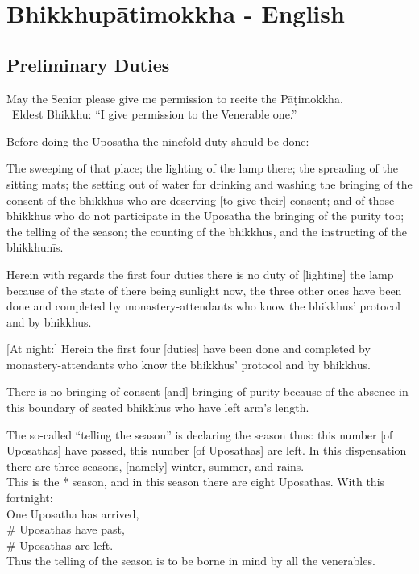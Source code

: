 


\chapter{Bhikkhupātimokkha - English}

\clearpage



\section{Preliminary Duties}
\label{preliminary-duties}

\begin{intro}
	May the Senior please give me permission to recite the Pāṭimokkha.\\
	\anglebracketleft\ \hspace{-0.5mm}Eldest Bhikkhu: ``I give permission to the Venerable one.'' \hspace{-0.5mm}\anglebracketright\
\end{intro}

Before doing the Uposatha the ninefold duty should be done:

The sweeping of that place; the lighting of the lamp there; the spreading of the sitting mats; the setting out of water for drinking and washing the bringing of the consent of the bhikkhus who are deserving [to give their] consent; and of those bhikkhus who do not participate in the Uposatha the bringing of the purity too; the telling of the season; the counting of the bhikkhus, and the instructing of the bhikkhunīs.

Herein with regards the first four duties there is no duty of [lighting] the lamp because of the state of there being sunlight now, the three other ones have been done and completed by monastery-attendants who know the bhikkhus' protocol and by bhikkhus.

	[At night:] Herein the first four [duties] have been done and completed by monastery-attendants who know the bhikkhus’ protocol and by bhikkhus.

There is no bringing of consent [and] bringing of purity because of the absence in this boundary of seated bhikkhus who have left arm's length.

The so-called ``telling the season'' is declaring the season thus: this number [of Uposathas] have passed, this number [of Uposathas] are left. In this dispensation there are three seasons, [namely] winter, summer, and rains.\\
This is the * season, and in this season there are eight Uposathas. With this fortnight:\\
One Uposatha has arrived,\\
\# Uposathas have past,\\
\# Uposathas are left.\\
Thus the telling of the season is to be borne in mind by all the venerables.

